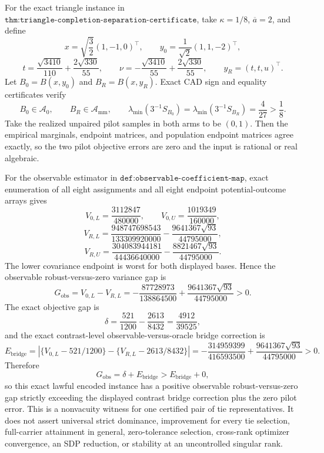 For the exact triangle instance in \(\texttt{thm:triangle-completion-separation-certificate}\), take \(\kappa=1/8\), \(\overline a=2\), and define
\[
x=\sqrt{\frac32}(1,-1,0)^{\top},
\qquad
y_0=\frac1{\sqrt2}(1,1,-2)^{\top},
\]
\[
t=\frac{\sqrt{3410}}{110}+\frac{2\sqrt{330}}{55},
\qquad
\nu=-\frac{\sqrt{3410}}{55}+\frac{2\sqrt{330}}{55},
\qquad
y_R=(t,t,u)^{\top}.
\]
Let \(B_0=B(x,y_0)\) and \(B_R=B(x,y_R)\).  Exact CAD sign and equality certificates verify
\[
B_0\in\mathcal A_0,
\qquad
B_R\in\mathcal A_{\mathrm{mm}},
\qquad
\lambda_{\min}(3^{-1}S_{B_0})
=\lambda_{\min}(3^{-1}S_{B_R})=\frac4{27}>\frac18.
\]
Take the realized unpaired pilot samples in both arms to be \((0,1)\).  Then the empirical marginals, endpoint matrices, and population endpoint matrices agree exactly, so the two pilot objective errors are zero and the input is rational or real algebraic.

For the observable estimator in \(\texttt{def:observable-coefficient-map}\), exact enumeration of all eight assignments and all eight endpoint potential-outcome arrays gives
\[
V_{0,L}=\frac{3112847}{480000},
\qquad
V_{0,U}=\frac{1019349}{160000},
\]
\[
V_{R,L}
=\frac{948747698543}{133309920000}
-\frac{9641367\sqrt{93}}{44795000},
\]
\[
V_{R,U}
=\frac{304083944181}{44436640000}
-\frac{8821467\sqrt{93}}{44795000}.
\]
The lower covariance endpoint is worst for both displayed bases.  Hence the observable robust-versus-zero variance gap is
\[
G_{\mathrm{obs}}
=V_{0,L}-V_{R,L}
=-\frac{87728973}{138864500}
+\frac{9641367\sqrt{93}}{44795000}>0.
\]
The exact objective gap is
\[
\delta=\frac{521}{1200}-\frac{2613}{8432}
=\frac{4912}{39525},
\]
and the exact contrast-level observable-versus-oracle bridge correction is
\[
E_{\mathrm{bridge}}
=\left|
\{V_{0,L}-521/1200\}
-\{V_{R,L}-2613/8432\}
\right|
=-\frac{314959399}{416593500}
+\frac{9641367\sqrt{93}}{44795000}>0.
\]
Therefore
\[
G_{\mathrm{obs}}
=\delta+E_{\mathrm{bridge}}
>E_{\mathrm{bridge}}+0,
\]
so this exact lawful encoded instance has a positive observable robust-versus-zero gap strictly exceeding the displayed contrast bridge correction plus the zero pilot error.  This is a nonvacuity witness for one certified pair of tie representatives.  It does not assert universal strict dominance, improvement for every tie selection, full-carrier attainment in general, zero-tolerance selection, cross-rank optimizer convergence, an SDP reduction, or stability at an uncontrolled singular rank.